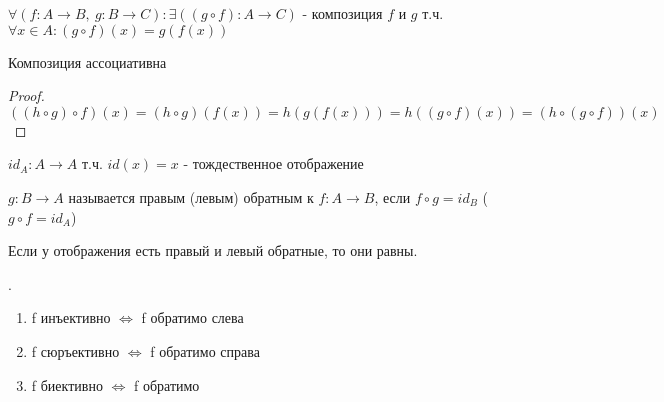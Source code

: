 \documentclass[calculus]{subfiles}
\begin{document}
    \begin{notation}
        $\forall (f:A \to B, \  g: B \to C): \exists ((g \circ f) : A \to C )$ - композиция $f$ и $g$ т.ч. $\forall x \in A: (g \circ f)(x) = g(f(x))$
    \end{notation}

    \begin{remark}
        Композиция ассоциативна
    \end{remark}

    \begin{proof}
        $((h \circ g) \circ f)(x) = (h \circ g)(f(x)) = h(g(f(x))) = h((g \circ f)(x)) = (h \circ (g \circ f))(x)$
    \end{proof}

    \begin{definition}
        $id_A: A \to A$ т.ч. $id(x)=x$ - тождественное отображение
    \end{definition}

    \begin{definition}[Обратный]
        $g: B \to A$ называется правым (левым) обратным к $f: A \to B$, если $f \circ g = id_B$ ($g \circ f = id_A$)
    \end{definition}

    \begin{remark}
        Если у отображения есть правый и левый обратные, то они равны.
    \end{remark}

    \begin{remark}
        .
        \begin{enumerate}
            \item f инъективно $\iff$ f обратимо слева
            \item f сюръективно $\iff$ f обратимо справа
            \item f биективно $\iff$ f обратимо
        \end{enumerate}
    \end{remark}
\end{document}

